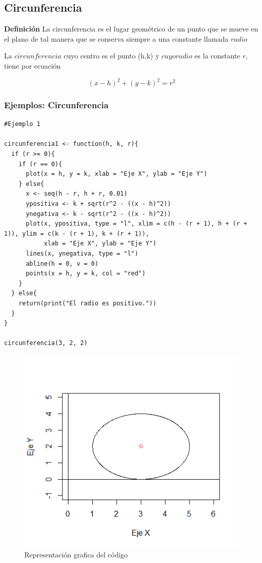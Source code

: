 \documentclass[12pt,a4paper]{article} %
\begin{document}
\newpage

\subsection{Circunferencia} \label{subsec:circunferencia}
\citep{geometria}\textbf{Definición} La circunferencia es el lugar geométrico de un punto que se mueve en el plano de tal manera que se conserva siempre a una constante llamada $radio$

La $circunferencia$ cuyo centro es el punto (h,k) y $cuyo radio$ es la constante $r$, tiene por ecuación

$${(x - h)^2 + (y - k)^2 = r^2}$$

\subsubsection{Ejemplos: Circunferencia}

\begin{table}[htpb]
	\begin{lstlisting}
#Ejemplo 1 

circunferencia1 <- function(h, k, r){
  if (r >= 0){ 
    if (r == 0){ 
      plot(x = h, y = k, xlab = "Eje X", ylab = "Eje Y") 
    } else{
      x <- seq(h - r, h + r, 0.01) 
      ypositiva <- k + sqrt(r^2 - ((x - h)^2)) 
      ynegativa <- k - sqrt(r^2 - ((x - h)^2)) 
      plot(x, ypositiva, type = "l", xlim = c(h - (r + 1), h + (r + 1)), ylim = c(k - (r + 1), k + (r + 1)),
           xlab = "Eje X", ylab = "Eje Y")
      lines(x, ynegativa, type = "l")
      abline(h = 0, v = 0) 
      points(x = h, y = k, col = "red") 
    }
  } else{
    return(print("El radio es positivo."))
  }
}

circunferencia(3, 2, 2)
	\end{lstlisting}
	\caption{Primer código en R para gráficar la circunferencia de la figura \ref{fig:Circunferencia}.}
\label{alg:Circunferencia}	
\end{table}

\begin{figure}
\centering
\includegraphics[scale=0.8]{Circunferencia1}
\caption{Representación grafica del código}
\label{fig:Circunferencia}
\end{figure}
\end{document}
